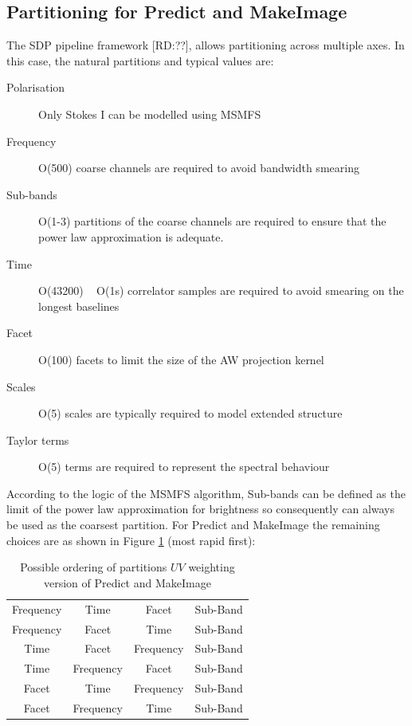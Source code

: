 \documentclass[11pt,a4paper]{article}
\begin{document}
\subsection{Partitioning for Predict and MakeImage}
\label{subsec:partitoningpredictmakeimage}

The SDP pipeline framework [RD:??], allows partitioning across multiple axes. In this case, the natural partitions and typical values are:

\begin{description}
\item[Polarisation] Only Stokes I can be modelled using MSMFS
\item[Frequency] O(500) coarse channels are required to avoid bandwidth smearing
\item[Sub-bands] O(1-3) partitions of the coarse channels are required to ensure that the power law approximation is adequate.
\item[Time] O(43200) ~ O(1s) correlator samples are required to avoid smearing on the longest baselines
\item[Facet] O(100) facets to limit the size of the AW projection kernel
\item[Scales] O(5) scales are typically required to model extended structure
\item[Taylor terms] O(5) terms are required to represent the spectral behaviour
\end{description}

According to the logic of the MSMFS algorithm, Sub-bands can be defined as the limit of the power law approximation for brightness so consequently can always be used as the coarsest partition. For Predict and MakeImage the remaining choices are as shown in Figure \ref{tab:partitions} (most rapid first):

\begin{table}[htp]
 \caption{Possible ordering of partitions $UV$ weighting version of Predict and MakeImage}
 \label{tab:partitions}
 \begin{center}
 \begin{tabular}{|c|c|c|c|}
\hline
Frequency & Time & Facet & Sub-Band \\
Frequency & Facet & Time & Sub-Band \\
Time & Facet & Frequency & Sub-Band \\
Time & Frequency & Facet & Sub-Band \\
Facet & Time & Frequency & Sub-Band \\
Facet & Frequency & Time & Sub-Band \\
\hline
\end{tabular}
\end{center}
\end{table}
\end{document}
